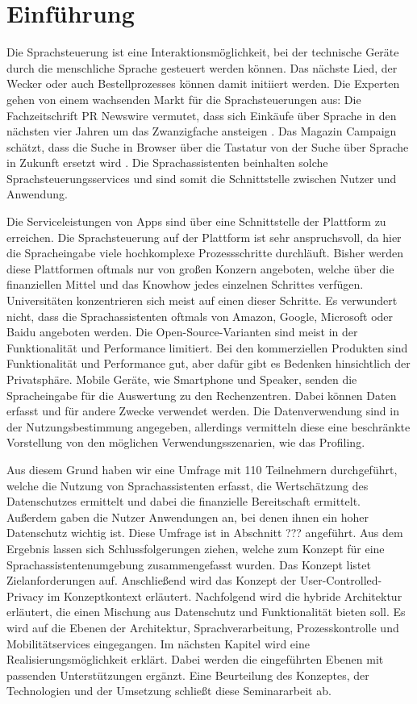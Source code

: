 \section{Einführung}
Die Sprachsteuerung ist eine Interaktionsmöglichkeit, bei der technische Geräte durch die menschliche Sprache gesteuert werden können. Das nächste Lied, der Wecker oder auch Bestellprozesses können damit initiiert werden.  Die Experten gehen von einem wachsenden Markt für die Sprachsteuerungen aus: Die Fachzeitschrift \glqq PR Newswire\grqq{} vermutet, dass sich Einkäufe über Sprache in den nächsten vier Jahren um das Zwanzigfache ansteigen \cite{prNewswire}. Das Magazin \glqq Campaign\grqq{} schätzt, dass die Suche in Browser über die Tastatur von der Suche über Sprache in Zukunft ersetzt wird \cite{Campaign}. Die Sprachassistenten beinhalten solche Sprachsteuerungsservices und sind somit die Schnittstelle zwischen Nutzer und Anwendung. \newline

Die Serviceleistungen von Apps sind über eine Schnittstelle der Plattform zu erreichen. Die Sprachsteuerung auf der Plattform ist sehr anspruchsvoll, da hier die Spracheingabe viele hochkomplexe Prozessschritte durchläuft. Bisher werden diese Plattformen oftmals nur von großen Konzern angeboten, welche über die finanziellen Mittel und das Knowhow jedes einzelnen Schrittes verfügen. Universitäten konzentrieren sich meist auf einen dieser Schritte. Es verwundert nicht, dass die Sprachassistenten oftmals von Amazon, Google, Microsoft oder Baidu angeboten werden. Die Open-Source-Varianten sind meist in der Funktionalität und Performance limitiert. Bei den kommerziellen Produkten sind Funktionalität und Performance gut, aber dafür gibt es Bedenken hinsichtlich der Privatsphäre. Mobile Geräte, wie Smartphone und Speaker, senden die Spracheingabe für die Auswertung zu den Rechenzentren. Dabei können Daten erfasst und für andere Zwecke verwendet werden. Die Datenverwendung sind in der Nutzungsbestimmung angegeben, allerdings vermitteln diese eine beschränkte Vorstellung von den möglichen Verwendungsszenarien, wie das Profiling. 

Aus diesem Grund haben wir eine Umfrage mit 110 Teilnehmern durchgeführt, welche die Nutzung von Sprachassistenten erfasst, die Wertschätzung des Datenschutzes ermittelt und dabei die finanzielle Bereitschaft ermittelt. Außerdem gaben die Nutzer Anwendungen an, bei denen ihnen ein hoher Datenschutz wichtig ist. Diese Umfrage ist in Abschnitt ??? angeführt. Aus dem Ergebnis lassen sich Schlussfolgerungen ziehen, welche zum Konzept für eine Sprachassistentenumgebung zusammengefasst wurden. Das Konzept listet Zielanforderungen auf. Anschließend wird das Konzept der User-Controlled-Privacy im Konzeptkontext erläutert.
Nachfolgend wird die hybride Architektur erläutert, die einen Mischung aus Datenschutz und Funktionalität bieten soll. Es wird auf die Ebenen der Architektur, Sprachverarbeitung, Prozesskontrolle und Mobilitätservices eingegangen.
Im nächsten Kapitel wird eine Realisierungsmöglichkeit erklärt. Dabei werden die eingeführten Ebenen mit passenden Unterstützungen ergänzt. 
Eine Beurteilung des Konzeptes, der Technologien und der Umsetzung schließt diese Seminararbeit ab.
